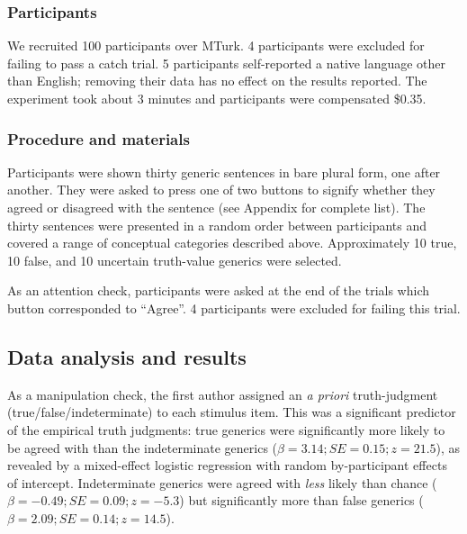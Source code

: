 \documentclass[12pt,letterpaper]{article}
\newcommand{\ndg}[1]{\textcolor{Green}{[ndg: #1]}}
\begin{document}
\subsubsection*{Participants}

We recruited 100 participants over MTurk. 
4 participants were excluded for failing to pass a catch trial.
5 participants self-reported a native language other than English; removing their data has no effect on the results reported. 
The experiment took about 3 minutes and participants were compensated \$0.35.

\subsubsection*{Procedure and materials}

Participants were shown thirty generic sentences in bare plural form, one after another.
They were asked to press one of two buttons to signify whether they agreed or disagreed with the sentence (see Appendix for complete list). 
The thirty sentences were presented in a random order between participants and covered a range of conceptual categories described above.
Approximately 10 true, 10 false, and 10 uncertain truth-value generics were selected.

As an attention check, participants were asked at the end of the trials which button corresponded to ``Agree''.
4 participants were excluded for failing this trial.

\subsection*{Data analysis and results}
 
 As a manipulation check, the first author assigned an \emph{a priori} truth-judgment (true/false/indeterminate) to each stimulus item.
This was a significant predictor of the empirical truth judgments: true generics were significantly more likely to be agreed with than the indeterminate generics ($\beta = 3.14; SE = 0.15; z = 21.5$), as revealed by a mixed-effect logistic regression with random by-participant effects of intercept.
Indeterminate generics were agreed with \emph{less} likely than chance ($\beta = -0.49; SE = 0.09; z = -5.3$) but significantly more than false generics ($\beta = 2.09; SE = 0.14; z = 14.5$).
\end{document}
